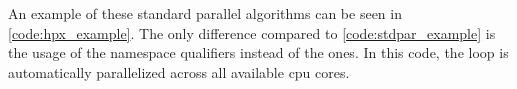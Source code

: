 An example of these  standard parallel algorithms can be seen in \autoref{code:hpx_example}. 
The only difference compared to \autoref{code:stdpar_example} is the usage of the  namespace qualifiers instead of the  ones. 
In this code, the  loop is automatically parallelized across all available \gls{cpu} cores. 


